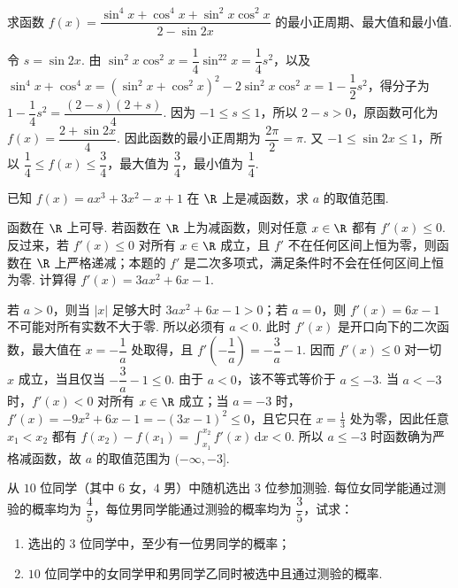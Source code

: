 \begin{problem}
求函数 \(f(x)=\dfrac{\sin^4x+\cos^4x+\sin^2x\cos^2x}{2-\sin2x}\) 的最小正周期、最大值和最小值.
\end{problem}

\begin{solution}
令 \(s=\sin2x\). 由 \(\sin^2x\cos^2x=\dfrac14\sin^22x=\dfrac14s^2\)，以及 \(\sin^4x+\cos^4x=(\sin^2x+\cos^2x)^2-2\sin^2x\cos^2x=1-\dfrac12s^2\)，得分子为 \(1-\dfrac14s^2=\dfrac{(2-s)(2+s)}4\). 因为 \(-1\leqslant s\leqslant1\)，所以 \(2-s>0\)，原函数可化为 \(f(x)=\dfrac{2+\sin2x}{4}\). 因此函数的最小正周期为 \(\dfrac{2\pi}{2}=\pi\). 又 \(-1\leqslant\sin2x\leqslant1\)，所以 \(\dfrac14\leqslant f(x)\leqslant\dfrac34\)，最大值为 \(\dfrac34\)，最小值为 \(\dfrac14\).
\end{solution}

\begin{problem}
已知 \(f(x)=ax^3+3x^2-x+1\) 在 \(\R\) 上是减函数，求 \(a\) 的取值范围.
\end{problem}

\begin{solution}
函数在 \(\R\) 上可导. 若函数在 \(\R\) 上为减函数，则对任意 \(x\in\R\) 都有 \(f'(x)\leqslant0\). 反过来，若 \(f'(x)\leqslant0\) 对所有 \(x\in\R\) 成立，且 \(f'\) 不在任何区间上恒为零，则函数在 \(\R\) 上严格递减；本题的 \(f'\) 是二次多项式，满足条件时不会在任何区间上恒为零. 计算得 \(f'(x)=3ax^2+6x-1\).

若 \(a>0\)，则当 \(|x|\) 足够大时 \(3ax^2+6x-1>0\)；若 \(a=0\)，则 \(f'(x)=6x-1\) 不可能对所有实数不大于零. 所以必须有 \(a<0\). 此时 \(f'(x)\) 是开口向下的二次函数，最大值在 \(x=-\dfrac1a\) 处取得，且 \(f'\left(-\dfrac1a\right)=-\dfrac3a-1\). 因而 \(f'(x)\leqslant0\) 对一切 \(x\) 成立，当且仅当 \(-\dfrac3a-1\leqslant0\). 由于 \(a<0\)，该不等式等价于 \(a\leqslant-3\). 当 \(a<-3\) 时，\(f'(x)<0\) 对所有 \(x\in\R\) 成立；当 \(a=-3\) 时，\(f'(x)=-9x^2+6x-1=-(3x-1)^2\leqslant0\)，且它只在 \(x=\frac{1}{3}\) 处为零，因此任意 \(x_1<x_2\) 都有 \(f(x_2)-f(x_1)=\displaystyle\int_{x_1}^{x_2}f'(x)\,\mathrm{d}x<0\). 所以 \(a\leqslant-3\) 时函数确为严格减函数，故 \(a\) 的取值范围为 \((-\infty,-3]\).
\end{solution}

\begin{problem}
从 \(10\) 位同学（其中 \(6\) 女，\(4\) 男）中随机选出 \(3\) 位参加测验. 每位女同学能通过测验的概率均为 \(\dfrac45\)，每位男同学能通过测验的概率均为 \(\dfrac35\)，试求：

\begin{enumerate}
\item 选出的 \(3\) 位同学中，至少有一位男同学的概率；
\item \(10\) 位同学中的女同学甲和男同学乙同时被选中且通过测验的概率.
\end{enumerate}
\end{problem}

